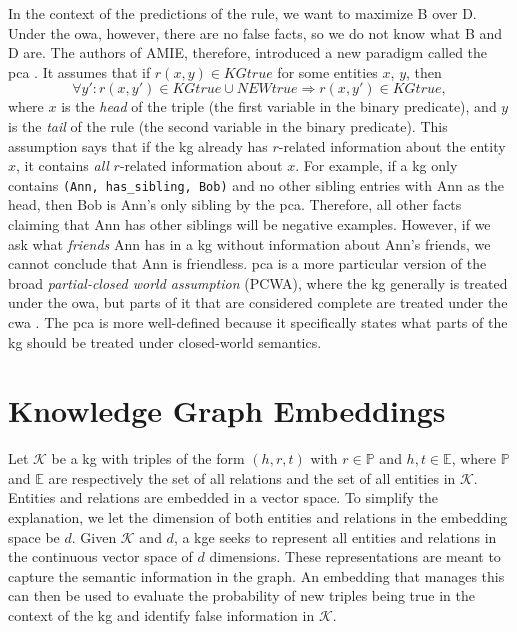 In the context of the predictions of the rule, we want to maximize B over D. Under the \gls{owa}, however, there are no false facts, so we do not know what B and D are. The authors of AMIE, therefore, introduced a new paradigm called the \gls{pca} \cite{amie}. It assumes that if $r(x, y) \in KG true$ for some entities $x$, $y$, then
\[\forall y' : r(x, y') \in KGtrue \cup NEWtrue \Rightarrow r(x, y') \in KGtrue,\]
where $x$ is the \textit{head} of the triple (the first variable in the binary predicate), and $y$ is the \textit{tail} of the rule (the second variable in the binary predicate).
This assumption says that if the \gls{kg} already has $r$-related information about the entity $x$, it contains \textit{all} $r$-related information about $x$. For example, if a \gls{kg} only contains \texttt{(Ann, has\_sibling, Bob)} and no other sibling entries with Ann as the head, then Bob is Ann's only sibling by the \gls{pca}. Therefore, all other facts claiming that Ann has other siblings will be negative examples. However, if we ask what \textit{friends} Ann has in a \gls{kg} without information about Ann's friends, we cannot conclude that Ann is friendless. \gls{pca} is a more particular version of the broad \textit{partial-closed world assumption} (PCWA), where the \gls{kg} generally is treated under the \gls{owa}, but parts of it that are considered complete are treated under the \gls{cwa} \cite{motro1989integrity}. The \gls{pca} is more well-defined because it specifically states what parts of the \gls{kg} should be treated under closed-world semantics.

\section{Knowledge Graph Embeddings}
\label{KG_embeddings}
Let $\mathcal{K}$ be a \gls{kg} with triples of the form $(h, r, t)$ with $r\in \mathbb{P}$ and $h, t \in \mathbb{E}$, where $\mathbb{P}$ and $\mathbb{E}$ are respectively the set of all relations and the set of all entities in $\mathcal{K}$. Entities and relations are embedded in a vector space. To simplify the explanation, we let the dimension of both entities and relations in the embedding space be $d$.
Given $\mathcal{K}$ and $d$, a \gls{kge} seeks to represent all entities and relations in the continuous vector space of $d$ dimensions. These representations are meant to capture the semantic information in the graph. An embedding that manages this can then be used to evaluate the probability of new triples being true in the context of the \gls{kg} and identify false information in $\mathcal{K}$.%

